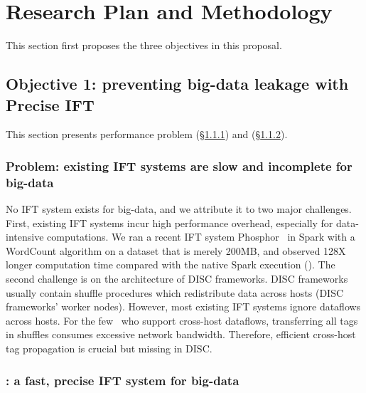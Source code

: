 \vspace{-.15in}\section{Research Plan and Methodology}
\label{sec:plan}\vspace{-.075in}

This section first proposes the three objectives in this proposal.

\vspace{-.15in}\subsection{Objective 1: 
preventing big-data leakage with Precise 
IFT}\label{sec:obj1}\vspace{-.075in}

This section presents \paxos performance problem (\S\ref{sec:ift-problem}) 
and \kakute (\S\ref{sec:kakute}).

\vspace{-.15in}
\subsubsection{Problem: existing IFT systems are slow and incomplete for 
big-data} 
\label{sec:ift-problem}\vspace{-.075in}

No IFT system exists for big-data, and
we attribute it to two major challenges.
First, existing IFT systems incur high performance overhead, especially for 
data-intensive computations. We ran a recent IFT system
Phosphor~\cite{oo14:phosphor} in Spark with a WordCount algorithm on a dataset 
that is merely 200MB, and
observed 128X longer computation time compared with the native Spark execution 
(). The second challenge is on the architecture of 
DISC frameworks.
DISC frameworks usually contain shuffle procedures which redistribute
data across hosts (DISC frameworks' worker nodes).
However, most existing IFT systems ignore dataflows across hosts.
For the few~\cite{cloudfence:raid13} who support cross-host dataflows,
transferring all tags in shuffles consumes excessive network
bandwidth. Therefore, efficient cross-host tag propagation
is crucial but missing in DISC.

\vspace{-.15in}\subsubsection{\kakute: a fast, precise IFT system for big-data} 
\label{sec:kakute}\vspace{-.075in}

